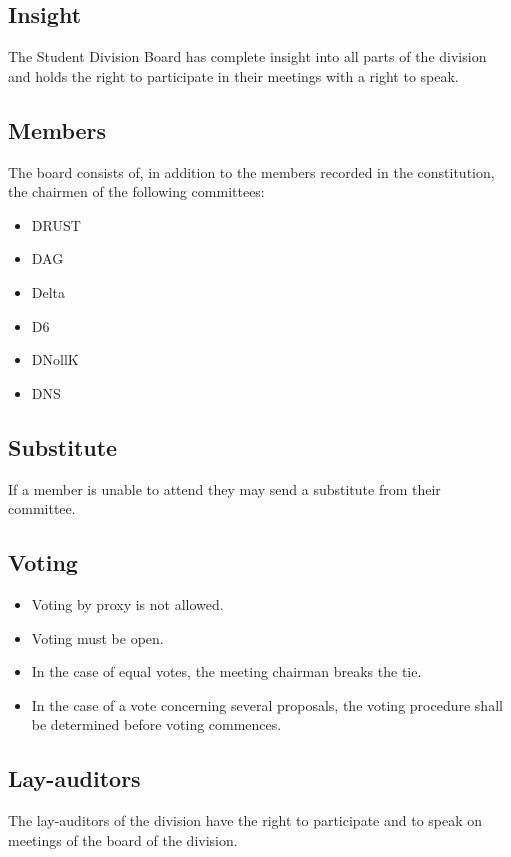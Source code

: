 \subsection{Insight} 
The Student Division Board has complete insight into all parts of the division and holds the right to participate in their meetings with a right to speak. 

\subsection{Members}
The board consists of, in addition to the members recorded in the constitution, the chairmen of the following committees:
\begin{itemize}
  \item DRUST 
  \item DAG 
  \item Delta 
  \item D6 
  \item DNollK
  \item DNS
\end{itemize}

\subsection{Substitute} 
If a member is unable to attend they may send a substitute from their committee. 

\subsection{Voting} 

\begin{itemize}
  \item Voting by proxy is not allowed.
  \item Voting must be open.
  \item In the case of equal votes, the meeting chairman breaks the tie.
  \item In the case of a vote concerning several proposals, the voting procedure shall be determined before voting commences.
\end{itemize}

\subsection{Lay-auditors}
The lay-auditors of the division have the right to participate and to speak on meetings of the board of the division.

\newpage
